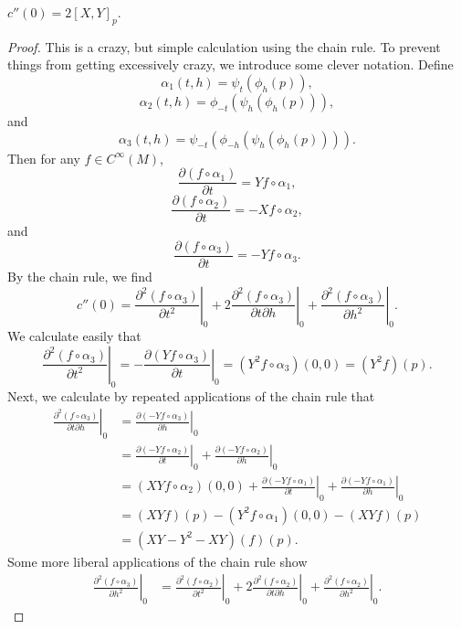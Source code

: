 \begin{theorem}
    $c''(0) = 2 [X,Y]_p$.
\end{theorem}
\begin{proof}
    This is a crazy, but simple calculation using the chain rule. To prevent things from getting excessively crazy, we introduce some clever notation. Define
    \[ \alpha_1(t,h) = \psi_t(\phi_h(p)), \]
    \[ \alpha_2(t,h) = \phi_{-t}(\psi_h(\phi_h(p))), \]
    and
    \[ \alpha_3(t,h) = \psi_{-t}(\phi_{-h}(\psi_h(\phi_h(p)))). \]
    Then for any $f \in C^\infty(M)$,
    \[ \frac{\partial (f \circ \alpha_1)}{\partial t} = Yf \circ \alpha_1, \]
    \[ \frac{\partial (f \circ \alpha_2)}{\partial t} = -Xf \circ \alpha_2, \]
    and
    \[ \frac{\partial (f \circ \alpha_3)}{\partial t} = -Yf \circ \alpha_3. \]
    By the chain rule, we find
    \[ c''(0) = \left. \frac{\partial^2 (f \circ \alpha_3)}{\partial t^2} \right|_0 + 2 \left. \frac{\partial^2 (f \circ \alpha_3)}{\partial t \partial h} \right|_0 + \left. \frac{\partial^2 (f \circ \alpha_3)}{\partial h^2} \right|_0. \]
    We calculate easily that
    \[ \left. \frac{\partial^2 (f \circ \alpha_3)}{\partial t^2} \right|_0 = - \left. \frac{\partial (Yf \circ \alpha_3)}{\partial t} \right|_0 = (Y^2f \circ \alpha_3)(0,0) = (Y^2f)(p). \]
    Next, we calculate by repeated applications of the chain rule that
    \begin{align*}
        \left. \frac{\partial^2 (f \circ \alpha_3)}{\partial t \partial h} \right|_0 &= \left. \frac{\partial (-Yf \circ \alpha_3)}{\partial h} \right|_0\\
        &= \left. \frac{\partial (-Yf \circ \alpha_2)}{\partial t} \right|_0 + \left. \frac{\partial (-Yf \circ \alpha_2)}{\partial h} \right|_0\\
        &= (XYf \circ \alpha_2)(0,0) + \left. \frac{\partial (-Yf \circ \alpha_1)}{\partial t} \right|_0 + \left. \frac{\partial (-Yf \circ \alpha_1)}{\partial h} \right|_0\\
        &= (XYf)(p) - (Y^2f \circ \alpha_1)(0,0) - (XYf)(p)\\
        &= (XY - Y^2 - XY)(f)(p).
    \end{align*}
    Some more liberal applications of the chain rule show
    \begin{align*}
        \left. \frac{\partial^2 (f \circ \alpha_3)}{\partial h^2} \right|_0 &= \left. \frac{\partial^2 (f \circ \alpha_2)}{\partial t^2} \right|_0 + 2 \left. \frac{\partial^2 (f \circ \alpha_2)}{\partial t \partial h} \right|_0 + \left. \frac{\partial^2 (f \circ \alpha_2)}{\partial h^2} \right|_0.

\end{align*}
\end{proof}
